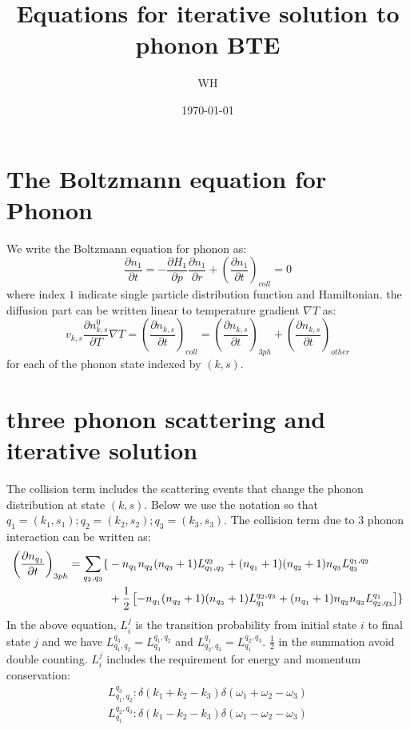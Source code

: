\documentclass{article}
\newcommand{\pfrac}[2]{\frac{\partial #1}{\partial #2}}
\begin{document}
\title{Equations for iterative solution to phonon BTE}
\author{WH}
\date{\today}
\maketitle

\section{The Boltzmann equation for Phonon}
We write the Boltzmann equation for phonon as:
\begin{equation}
    \pfrac{n_1}{t} = -\pfrac{H_1}{p} \pfrac{n_1}{r} + \left( \pfrac{n_1}{t} \right)_{coll} = 0 
\end{equation}
where index $1$ indicate single particle distribution function and Hamiltonian. 
the diffusion part can be written linear to temperature gradient $\nabla T$ as:
\begin{equation}
    v_{k,s} \pfrac{n_{k,s}^0}{T} \nabla T = \left( \pfrac{n_{k,s}}{t} \right)_{coll} 
            = \left( \pfrac{n_{k,s}}{t} \right)_{3ph}  + \left( \pfrac{n_{k,s}}{t} \right)_{other} \label{bte}
\end{equation}
for each of the phonon state indexed by $(k,s)$. 

\section{three phonon scattering and iterative solution}

The collision term includes the scattering events that change the phonon distribution at state $(k,s)$.
Below we use the notation so that $q_1 = (k_1, s_1); q_2 = (k_2, s_2); q_3 = (k_3, s_3)$. The collision term due to 
3 phonon interaction can be written as:
\begin{align}
    \left( \pfrac{n_{q_1}}{t} \right)_{3ph} = \sum_{q_2,q_3} 
        \{ &-n_{q_1}n_{q_2}(n_{q_3}+1)L_{q_1,q_2}^{q_3} + (n_{q_1}+1)(n_{q_2}+1)n_{q_3}L^{q_1,q_2}_{q_3}  \notag \\
           &+ \frac{1}{2} \left[ -n_{q_1}(n_{q_2}+1)(n_{q_3}+1)L_{q_1}^{q_2,q_3} +  (n_{q_1}+1)n_{q_2}n_{q_3}L^{q_1}_{q_2,q_3} \right] \} \label{summation}
\end{align}
In the above equation, $L_i^j$ is the transition probability from initial state $i$ to final state $j$
and we have $L_{q_1,q_2}^{q_3} = L^{q_1,q_2}_{q_3}$ 
and $L_{q_2,q_3}^{q_1} = L^{q_2,q_3}_{q_1}$. 
$\frac{1}{2}$ in the summation avoid double counting. $L_i^j$ includes the requirement for energy and momentum conservation:
\begin{align}
    L_{q_1,q_2}^{q_3} : \delta(k_1 + k_2 - k_3) \delta(\omega_1 + \omega_2 - \omega_3 ) \\
    L^{q_2,q_3}_{q_1} : \delta(k_1 - k_2 - k_3) \delta(\omega_1 - \omega_2 - \omega_3 ) 
\end{align}
\end{document}
